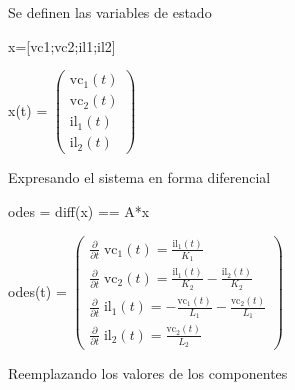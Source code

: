 \documentclass[10pt,a4paper]{article} %
\begin{document}
\begin{par}
	\begin{flushleft}
		Se definen las variables de estado
	\end{flushleft}
\end{par}

\begin{matlabcode}
	x=[vc1;vc2;il1;il2]
\end{matlabcode}
\begin{matlabsymbolicoutput}
	x(t) = 
	$\displaystyle \left(\begin{array}{c}
	{\textrm{vc}}_1 \left(t\right)\\
	{\textrm{vc}}_2 \left(t\right)\\
	{\textrm{il}}_1 \left(t\right)\\
	{\textrm{il}}_2 \left(t\right)
	\end{array}\right)$
\end{matlabsymbolicoutput}

\begin{par}
	\begin{flushleft}
		Expresando el sistema en forma diferencial
	\end{flushleft}
\end{par}

\begin{matlabcode}
	odes = diff(x) == A*x
\end{matlabcode}
\begin{matlabsymbolicoutput}
	odes(t) = 
	$\displaystyle \left(\begin{array}{c}
	\frac{\partial }{\partial t}\;{\textrm{vc}}_1 \left(t\right)=\frac{{\textrm{il}}_1 \left(t\right)}{K_1 }\\
	\frac{\partial }{\partial t}\;{\textrm{vc}}_2 \left(t\right)=\frac{{\textrm{il}}_1 \left(t\right)}{K_2 }-\frac{{\textrm{il}}_2 \left(t\right)}{K_2 }\\
	\frac{\partial }{\partial t}\;{\textrm{il}}_1 \left(t\right)=-\frac{{\textrm{vc}}_1 \left(t\right)}{L_1 }-\frac{{\textrm{vc}}_2 \left(t\right)}{L_1 }\\
	\frac{\partial }{\partial t}\;{\textrm{il}}_2 \left(t\right)=\frac{{\textrm{vc}}_2 \left(t\right)}{L_2 }
	\end{array}\right)$
\end{matlabsymbolicoutput}

\begin{par}
	\begin{flushleft}
		Reemplazando los valores de los componentes
	\end{flushleft}
\end{par}
\end{document}
